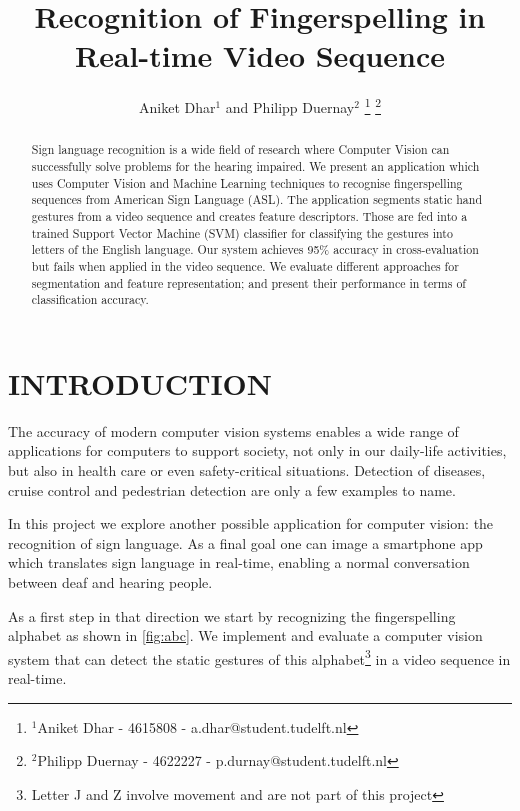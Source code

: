\documentclass[letterpaper, 10 pt, conference]{ieeeconf}  %
\title{\LARGE \bf
Recognition of Fingerspelling in Real-time Video Sequence
}
\author{Aniket Dhar$^{1}$ and Philipp Duernay$^{2}$%
\thanks{$^{1}$Aniket Dhar - 4615808 - a.dhar@student.tudelft.nl}%
\thanks{$^{2}$Philipp Duernay - 4622227 - p.durnay@student.tudelft.nl}%
}
\begin{document}
\maketitle
\thispagestyle{empty}
\pagestyle{empty}


\begin{abstract}

Sign language recognition is a wide field of research where Computer Vision can successfully solve problems for the hearing impaired. We present an application which uses Computer Vision and Machine Learning techniques to recognise fingerspelling sequences from American Sign Language (ASL). The application segments static hand gestures from a video sequence and creates feature descriptors. Those are fed into a trained Support Vector Machine (SVM) classifier for classifying the gestures into letters of the English language. Our system achieves 95\% accuracy in cross-evaluation but fails when applied in the video sequence. We evaluate different approaches for segmentation and feature representation; and present their performance in terms of classification accuracy.  

\end{abstract}


\section{INTRODUCTION}

The accuracy of modern computer vision systems enables a wide range of applications for computers to support society, not only in our daily-life activities, but also in health care or even safety-critical situations. Detection of diseases, cruise control and pedestrian detection are only a few examples to name. 

In this project we explore another possible application for computer vision: the recognition of sign language. As a final goal one can image a smartphone app which translates sign language in real-time, enabling a normal conversation between deaf and hearing people.

As a first step in that direction we start by recognizing the fingerspelling alphabet as shown in \autoref{fig:abc}. We implement and evaluate a computer vision system that can detect the static gestures of this alphabet\footnote{Letter J and Z involve movement and are not part of this project} in a video sequence in real-time. 
\end{document}
